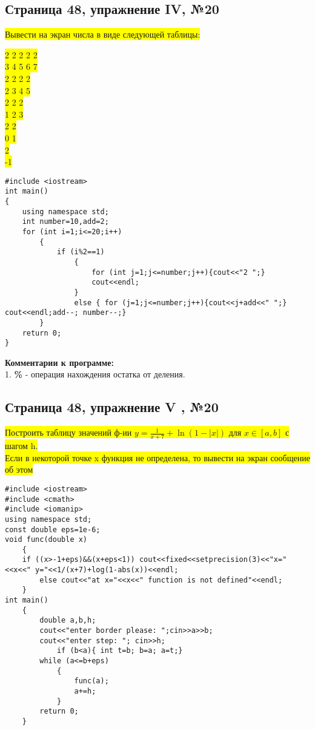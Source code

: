 \documentclass[11pt]{article}
\begin{document}
\begin{flushleft}
\newpage
\begin{center}
\section{Страница 48, упражнение IV, №20}
\colorbox{yellow}{Вывести на экран числа в виде следующей таблицы:}\\
\end{center}
\colorbox{yellow}{2 2 2 2 2}\\
\colorbox{yellow}{3 4 5 6 7}\\
\colorbox{yellow}{2 2 2 2}\\
\colorbox{yellow}{2 3 4 5}\\
\colorbox{yellow}{2 2 2}\\
\colorbox{yellow}{1 2 3}\\
\colorbox{yellow}{2 2}\\
\colorbox{yellow}{0 1}\\
\colorbox{yellow}{2}\\
\colorbox{yellow}{-1}\\

\begin{lstlisting}
#include <iostream>
int main()
{
	using namespace std;
	int number=10,add=2;
	for (int i=1;i<=20;i++)
		{
			if (i%2==1)
				{ 
					for (int j=1;j<=number;j++){cout<<"2 ";} 
					cout<<endl; 
				}
				else { for (j=1;j<=number;j++){cout<<j+add<<" ";} cout<<endl;add--; number--;}
		}
	return 0;
}
\end{lstlisting}


\textbf{Комментарии к программе:} \\
1. \textbf{\%} - операция нахождения остатка от деления.

\newpage
\begin{center}
\section{Страница 48, упражнение V , №20}
\colorbox{yellow}{Построить таблицу значений ф-ии $y=\frac{1}{x+7}+\ln(1-|x|)$ для $x \in [a,b]$ с шагом h.}\\
\colorbox{yellow}{Если в некоторой точке x функция не определена, то вывести на экран сообщение об этом}\\
\end{center}
\begin{lstlisting}
#include <iostream>
#include <cmath>
#include <iomanip>
using namespace std;
const double eps=1e-6;
void func(double x)
	{
	if ((x>-1+eps)&&(x+eps<1)) cout<<fixed<<setprecision(3)<<"x="<<x<<" y="<<1/(x+7)+log(1-abs(x))<<endl;
		else cout<<"at x="<<x<<" function is not defined"<<endl;
	}
int main()
	{
		double a,b,h;
		cout<<"enter border please: ";cin>>a>>b;
		cout<<"enter step: "; cin>>h;
			if (b<a){ int t=b; b=a; a=t;} 
		while (a<=b+eps)
			{
				func(a);
				a+=h;
			}
		return 0;
	}
\end{lstlisting}


\end{flushleft}
\end{document}
